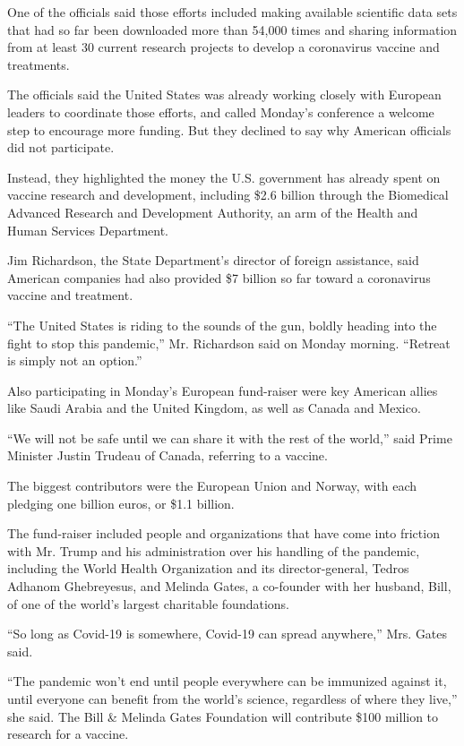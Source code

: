 One of the officials said those efforts included making available
scientific data sets that had so far been downloaded more than 54,000
times and sharing information from at least 30 current research projects
to develop a coronavirus vaccine and treatments.

The officials said the United States was already working closely with
European leaders to coordinate those efforts, and called Monday's
conference a welcome step to encourage more funding. But they declined
to say why American officials did not participate.

Instead, they highlighted the money the U.S. government has already
spent on vaccine research and development, including \$2.6 billion
through the Biomedical Advanced Research and Development Authority, an
arm of the Health and Human Services Department.

Jim Richardson, the State Department's director of foreign assistance,
said American companies had also provided \$7 billion so far toward a
coronavirus vaccine and treatment.

``The United States is riding to the sounds of the gun, boldly heading
into the fight to stop this pandemic,'' Mr. Richardson said on Monday
morning. ``Retreat is simply not an option.''

Also participating in Monday's European fund-raiser were key American
allies like Saudi Arabia and the United Kingdom, as well as Canada and
Mexico.

``We will not be safe until we can share it with the rest of the
world,'' said Prime Minister Justin Trudeau of Canada, referring to a
vaccine.

The biggest contributors were the European Union and Norway, with each
pledging one billion euros, or \$1.1 billion.

The fund-raiser included people and organizations that have come into
friction with Mr. Trump and his administration over his handling of the
pandemic, including the World Health Organization and its
director-general, Tedros Adhanom Ghebreyesus, and Melinda Gates, a
co-founder with her husband, Bill, of one of the world's largest
charitable foundations.

``So long as Covid-19 is somewhere, Covid-19 can spread anywhere,'' Mrs.
Gates said.

``The pandemic won't end until people everywhere can be immunized
against it, until everyone can benefit from the world's science,
regardless of where they live,'' she said. The Bill \& Melinda Gates
Foundation will contribute \$100 million to research for a vaccine.

